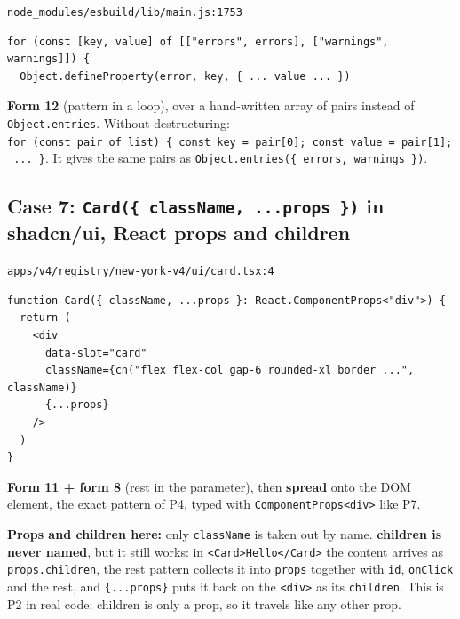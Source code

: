 \documentclass[
  10pt,
]{article}
\begin{document}
\texttt{node\_modules/\allowbreak{}esbuild/\allowbreak{}lib/\allowbreak{}main.\allowbreak{}js:1753}

\begin{verbatim}
for (const [key, value] of [["errors", errors], ["warnings", warnings]]) {
  Object.defineProperty(error, key, { ... value ... })
\end{verbatim}

\textbf{Form 12} (pattern in a loop), over a hand-written array of pairs
instead of \texttt{Object.\allowbreak{}entries}. Without destructuring:
\texttt{for\ (const\ pair\ of\ list)\ \{\ const\ key\ =\ pair{[}0{]\allowbreak{}};\ const\ value\ =\ pair{[}1{]\allowbreak{}};\ .\allowbreak{}.\allowbreak{}.\allowbreak{}\ \}}.
It gives the same pairs as
\texttt{Object.\allowbreak{}entries(\{\ errors,\ warnings\ \})}.

\hypertarget{case-7-card-classname-props--in-shadcnui-react-props-and-children}{%
\subsection{\texorpdfstring{Case 7:
\texttt{Card(\{\ className,\ .\allowbreak{}.\allowbreak{}.\allowbreak{}props\ \})}
in shadcn/ui, React props and
children}{Case 7:  in shadcn/ui, React props and children}}\label{case-7-card-classname-props--in-shadcnui-react-props-and-children}}

\texttt{apps/\allowbreak{}v4/\allowbreak{}registry/\allowbreak{}new-york-v4/\allowbreak{}ui/\allowbreak{}card.\allowbreak{}tsx:4}

\begin{verbatim}
function Card({ className, ...props }: React.ComponentProps<"div">) {
  return (
    <div
      data-slot="card"
      className={cn("flex flex-col gap-6 rounded-xl border ...", className)}
      {...props}
    />
  )
}
\end{verbatim}

\textbf{Form 11 + form 8} (rest in the parameter), then \textbf{spread}
onto the DOM element, the exact pattern of P4, typed with
\texttt{ComponentProps\textless{}\allowbreak{}\allowbreak{}\textquotesingle{}div\allowbreak{}\textquotesingle{}\textgreater{}\allowbreak{}}
like P7.

\textbf{Props and children here:} only \texttt{className} is taken out
by name. \textbf{children is never named}, but it still works: in
\texttt{\textless{}\allowbreak{}Card\textgreater{}\allowbreak{}Hello\textless{}\allowbreak{}/\allowbreak{}Card\textgreater{}\allowbreak{}}
the content arrives as \texttt{props.\allowbreak{}children}, the rest
pattern collects it into \texttt{props} together with \texttt{id},
\texttt{onClick} and the rest, and
\texttt{\{.\allowbreak{}.\allowbreak{}.\allowbreak{}props\}} puts it
back on the
\texttt{\textless{}\allowbreak{}div\textgreater{}\allowbreak{}} as its
\texttt{children}. This is P2 in real code: children is only a prop, so
it travels like any other prop.
\end{document}
